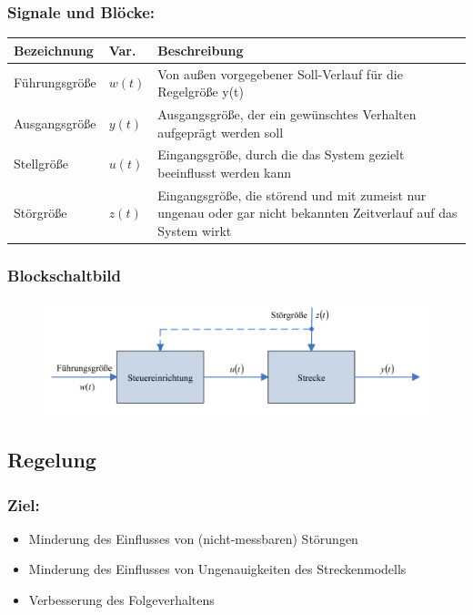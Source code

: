 \documentclass[10pt,a4paper]{article}
\begin{document}
\subsubsection*{Signale und Blöcke:}
\begin{tabularx}{\columnwidth}{llX}
	Bezeichnung & Var. & Beschreibung \\
	\hline
	Führungsgröße & $w(t)$ & Von außen vorgegebener Soll-Verlauf für die Regelgröße y(t) \\
	Ausgangsgröße & $y(t)$ & Ausgangsgröße, der ein gewünschtes Verhalten aufgeprägt werden soll \\
	Stellgröße & $u(t)$ & Eingangsgröße, durch die das System gezielt beeinflusst werden kann \\
	Störgröße & $z(t)$ & Eingangsgröße, die störend und mit zumeist nur ungenau oder gar nicht bekannten Zeitverlauf auf das System wirkt \\
\end{tabularx}

\subsubsection*{Blockschaltbild}
\begin{figure}[H]
	\includegraphics[width=0.8\columnwidth]{imgs/abb1_4.png}
\end{figure}


\subsection{Regelung}
\label{regelung}
\subsubsection*{Ziel:}
\begin{itemize}
		\item Minderung des Einflusses von (nicht-messbaren) Störungen
		\item Minderung des Einflusses von Ungenauigkeiten des Streckenmodells
		\item Verbesserung des Folgeverhaltens
\end{itemize}
\end{document}
